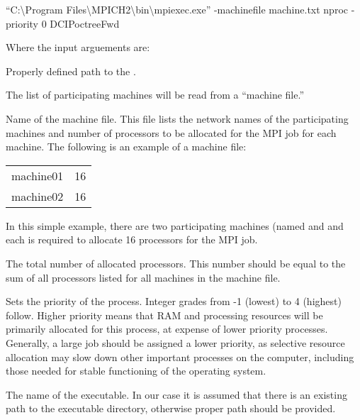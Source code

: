 \begin{fileExample}	
``C:\textbackslash Program Files\textbackslash MPICH2\textbackslash bin\textbackslash mpiexec.exe'' -machinefile machine.txt nproc -priority 0 DCIPoctreeFwd
\end{fileExample}

Where the input arguements are:
\begin{description}[leftmargin=5cm, style=sameline, align=left]
\item[\codeName{PATH}] Properly defined path to the .
\item[\codeName{-machinefile}] The list of participating machines will be read from a ``machine file.''
\item[\codeName{machine.txt}] Name of the machine file. This file lists the network names of the participating machines and number of processors to be allocated for the MPI job for each machine. The following is an example of a machine file:

\begin{fileExample}
\begin{tabular}{|lc|}
\hline
machine01 & 16 \\
machine02 & 16 \\
\hline
\end{tabular}
\end{fileExample}

In this simple example, there are two participating machines (named  and  and each is required to allocate 16 processors for the MPI job.

\item[\codeName{nproc}] The total number of allocated processors. This number should be equal to the sum of all processors listed for all machines in the machine file.
\item[\codeName{-priority 0}] Sets the priority of the process. Integer grades from -1 (lowest) to 4 (highest) follow. Higher priority means that RAM and processing resources will be primarily allocated for this process, at expense of lower priority processes. Generally, a large job should be assigned a lower priority, as selective resource allocation may slow down other important processes on the computer, including those needed for stable functioning of the operating system.
\item[\codeName{DCIPoctreeFwd}] The name of the executable. In our case it is assumed that there is an existing path to the executable directory, otherwise proper path should be provided.
\end{description} 


